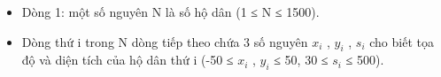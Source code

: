 \begin{itemize}
	\item     Dòng 1: một số nguyên N là số hộ dân (1 ≤ N ≤ 1500).   
	\item     Dòng thứ i trong N dòng tiếp theo chứa 3 số nguyên $x_{i}$    , $y_{i}$    , $s_{i}$    cho biết tọa độ và diện tích của hộ dân thứ i (-50 ≤ $x_{i}$    , $y_{i}$    ≤ 50, 30 ≤ $s_{i}$    ≤ 500).   
\end{itemize}